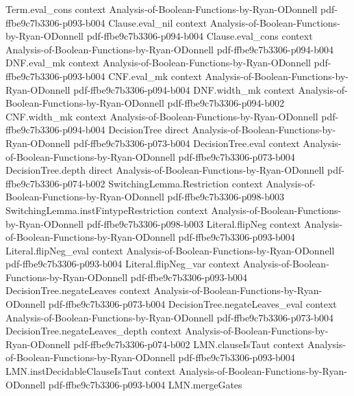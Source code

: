 \begin{lemma}
  {Term.eval_cons}
  {context}
  {Analysis-of-Boolean-Functions-by-Ryan-ODonnell}
  {pdf-ffbe9c7b3306-p093-b004}
\proofstep
  {Clause.eval_nil}
  {context}
  {Analysis-of-Boolean-Functions-by-Ryan-ODonnell}
  {pdf-ffbe9c7b3306-p094-b004}
\proofstep
  {Clause.eval_cons}
  {context}
  {Analysis-of-Boolean-Functions-by-Ryan-ODonnell}
  {pdf-ffbe9c7b3306-p094-b004}
\proofstep
  {DNF.eval_mk}
  {context}
  {Analysis-of-Boolean-Functions-by-Ryan-ODonnell}
  {pdf-ffbe9c7b3306-p093-b004}
\proofstep
  {CNF.eval_mk}
  {context}
  {Analysis-of-Boolean-Functions-by-Ryan-ODonnell}
  {pdf-ffbe9c7b3306-p094-b004}
\proofstep
  {DNF.width_mk}
  {context}
  {Analysis-of-Boolean-Functions-by-Ryan-ODonnell}
  {pdf-ffbe9c7b3306-p094-b002}
\proofstep
  {CNF.width_mk}
  {context}
  {Analysis-of-Boolean-Functions-by-Ryan-ODonnell}
  {pdf-ffbe9c7b3306-p094-b004}
\proofstep
  {DecisionTree}
  {direct}
  {Analysis-of-Boolean-Functions-by-Ryan-ODonnell}
  {pdf-ffbe9c7b3306-p073-b004}
\proofstep
  {DecisionTree.eval}
  {context}
  {Analysis-of-Boolean-Functions-by-Ryan-ODonnell}
  {pdf-ffbe9c7b3306-p073-b004}
\proofstep
  {DecisionTree.depth}
  {direct}
  {Analysis-of-Boolean-Functions-by-Ryan-ODonnell}
  {pdf-ffbe9c7b3306-p074-b002}
\proofstep
  {SwitchingLemma.Restriction}
  {context}
  {Analysis-of-Boolean-Functions-by-Ryan-ODonnell}
  {pdf-ffbe9c7b3306-p098-b003}
\proofstep
  {SwitchingLemma.instFintypeRestriction}
  {context}
  {Analysis-of-Boolean-Functions-by-Ryan-ODonnell}
  {pdf-ffbe9c7b3306-p098-b003}
\proofstep
  {Literal.flipNeg}
  {context}
  {Analysis-of-Boolean-Functions-by-Ryan-ODonnell}
  {pdf-ffbe9c7b3306-p093-b004}
\proofstep
  {Literal.flipNeg_eval}
  {context}
  {Analysis-of-Boolean-Functions-by-Ryan-ODonnell}
  {pdf-ffbe9c7b3306-p093-b004}
\proofstep
  {Literal.flipNeg_var}
  {context}
  {Analysis-of-Boolean-Functions-by-Ryan-ODonnell}
  {pdf-ffbe9c7b3306-p093-b004}
\proofstep
  {DecisionTree.negateLeaves}
  {context}
  {Analysis-of-Boolean-Functions-by-Ryan-ODonnell}
  {pdf-ffbe9c7b3306-p073-b004}
\proofstep
  {DecisionTree.negateLeaves_eval}
  {context}
  {Analysis-of-Boolean-Functions-by-Ryan-ODonnell}
  {pdf-ffbe9c7b3306-p073-b004}
\proofstep
  {DecisionTree.negateLeaves_depth}
  {context}
  {Analysis-of-Boolean-Functions-by-Ryan-ODonnell}
  {pdf-ffbe9c7b3306-p074-b002}
\proofstep
  {LMN.clauseIsTaut}
  {context}
  {Analysis-of-Boolean-Functions-by-Ryan-ODonnell}
  {pdf-ffbe9c7b3306-p093-b004}
\proofstep
  {LMN.instDecidableClauseIsTaut}
  {context}
  {Analysis-of-Boolean-Functions-by-Ryan-ODonnell}
  {pdf-ffbe9c7b3306-p093-b004}
\proofstep
  {LMN.mergeGates}

\end{lemma}
